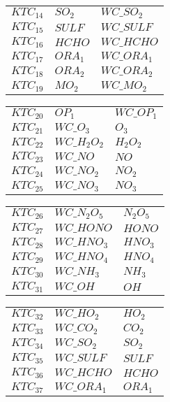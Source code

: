 {\begin{tabular}{l@{\,:\,}p{0.2\chfwidth}@{$\quad\longrightarrow\quad$}p{0.6\chfwidth}}
$KTC_{14}$ & $SO_{2}$ & $WC\_SO_{2}$ \\
$KTC_{15}$ & $SULF$ & $WC\_SULF$ \\
$KTC_{16}$ & $HCHO$ & $WC\_HCHO$ \\
$KTC_{17}$ & $ORA_{1}$ & $WC\_ORA_{1}$ \\
$KTC_{18}$ & $ORA_{2}$ & $WC\_ORA_{2}$ \\
$KTC_{19}$ & $MO_{2}$ & $WC\_MO_{2}$ \\
\end{tabular}
 
\begin{tabular}{l@{\,:\,}p{0.2\chfwidth}@{$\quad\longrightarrow\quad$}p{0.6\chfwidth}}
$KTC_{20}$ & $OP_{1}$ & $WC\_OP_{1}$ \\
$KTC_{21}$ & $WC\_O_{3}$ & $O_{3}$ \\
$KTC_{22}$ & $WC\_H_{2}O_{2}$ & $H_{2}O_{2}$ \\
$KTC_{23}$ & $WC\_NO$ & $NO$ \\
$KTC_{24}$ & $WC\_NO_{2}$ & $NO_{2}$ \\
$KTC_{25}$ & $WC\_NO_{3}$ & $NO_{3}$ \\
\end{tabular}
 
\begin{tabular}{l@{\,:\,}p{0.2\chfwidth}@{$\quad\longrightarrow\quad$}p{0.6\chfwidth}}
$KTC_{26}$ & $WC\_N_{2}O_{5}$ & $N_{2}O_{5}$ \\
$KTC_{27}$ & $WC\_HONO$ & $HONO$ \\
$KTC_{28}$ & $WC\_HNO_{3}$ & $HNO_{3}$ \\
$KTC_{29}$ & $WC\_HNO_{4}$ & $HNO_{4}$ \\
$KTC_{30}$ & $WC\_NH_{3}$ & $NH_{3}$ \\
$KTC_{31}$ & $WC\_OH$ & $OH$ \\
\end{tabular}
 
\begin{tabular}{l@{\,:\,}p{0.2\chfwidth}@{$\quad\longrightarrow\quad$}p{0.6\chfwidth}}
$KTC_{32}$ & $WC\_HO_{2}$ & $HO_{2}$ \\
$KTC_{33}$ & $WC\_CO_{2}$ & $CO_{2}$ \\
$KTC_{34}$ & $WC\_SO_{2}$ & $SO_{2}$ \\
$KTC_{35}$ & $WC\_SULF$ & $SULF$ \\
$KTC_{36}$ & $WC\_HCHO$ & $HCHO$ \\
$KTC_{37}$ & $WC\_ORA_{1}$ & $ORA_{1}$ \\
\end{tabular}
 
}
